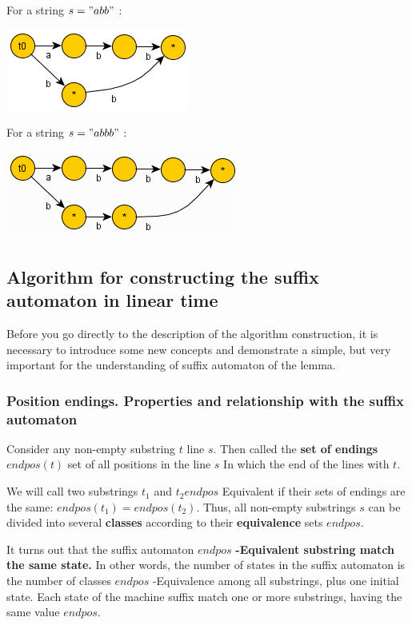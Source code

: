 For a string $s =" abb"$ :

\includegraphics[scale=0.5]{6.png}

For a string $s =" abbb"$ :

\includegraphics[scale=0.5]{7.png}

\subsection{ Algorithm for constructing the suffix automaton in linear time }

Before you go directly to the description of the algorithm construction, it is necessary to introduce some new concepts and demonstrate a simple, but very important for the understanding of suffix automaton of the lemma.

\subsubsection{ Position endings. Properties and relationship with the suffix automaton }

Consider any non-empty substring $t$ line $s$. Then called the \textbf{set of endings} $endpos (t)$ set of all positions in the line $s$ In which the end of the lines with $t$.

We will call two substrings $t_1$ and $t_2$$endpos$ Equivalent if their sets of endings are the same: $endpos (t_1) = endpos (t_2)$. Thus, all non-empty substrings $s$ can be divided into several \textbf{classes} according to their \textbf{equivalence} sets $endpos$.

It turns out that the suffix automaton \textbf{$endpos$} \textbf{-Equivalent substring match the same state.} In other words, the number of states in the suffix automaton is the number of classes $endpos$ -Equivalence among all substrings, plus one initial state. Each state of the machine suffix match one or more substrings, having the same value $endpos$.

